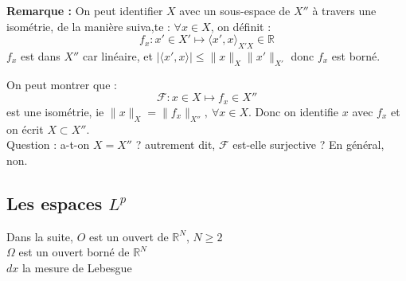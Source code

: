 
\textbf{Remarque : } On peut identifier $X$ avec un sous-espace de $X''$ à travers une isométrie, de la manière suiva,te : $\forall x\in X$, on définit : \[f_x : x'\in X' \mapsto \langle x',x\rangle_{X'X}\in\mathbb{R}\]
$f_x$ est dans $X''$ car linéaire, et $|\langle x',x\rangle|\leq \|x\|_X \|x'\|_{X'}$ donc $f_x$ est borné.

On peut montrer que : \[\mathcal{F} : x\in X \mapsto f_x\in X''\] est une isométrie, ie $\|x\|_X=\|f_x\|_{X''},\ \forall x\in X$. Donc on identifie $x$ avec $f_x$ et on écrit $X\subset X''$.\\
Question : a-t-on $X=X''$ ? autrement dit, $\mathcal{F}$ est-elle surjective ? En général, non.



\subsection{Les espaces $L^p$}
Dans la suite, $O$ est un ouvert de $\mathbb{R}^N$, $N\geq 2$\\
$\Omega$ est un ouvert borné de $\mathbb{R}^N$\\
$dx$ la mesure de Lebesgue\\



